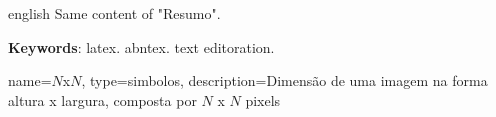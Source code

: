 \begin{resumo}[Abstract]
 \begin{otherlanguage*}{english}
   Same content of "Resumo".

   \vspace{\onelineskip}

   \noindent
   \textbf{Keywords}: latex. abntex. text editoration.
 \end{otherlanguage*}
\end{resumo}

%
%
%

\listoffigures*
\cleardoublepage

\listofquadros*
\cleardoublepage

\listoftables*
\cleardoublepage

%
\printglossary[type=\acronymtype,title={Lista de abreviaturas e siglas}]
\cleardoublepage

%

{%
	name=$N$x$N$,
	type=simbolos,
	description={Dimensão de uma imagem na forma altura x largura, composta por $N$ x $N$ pixels}
}

